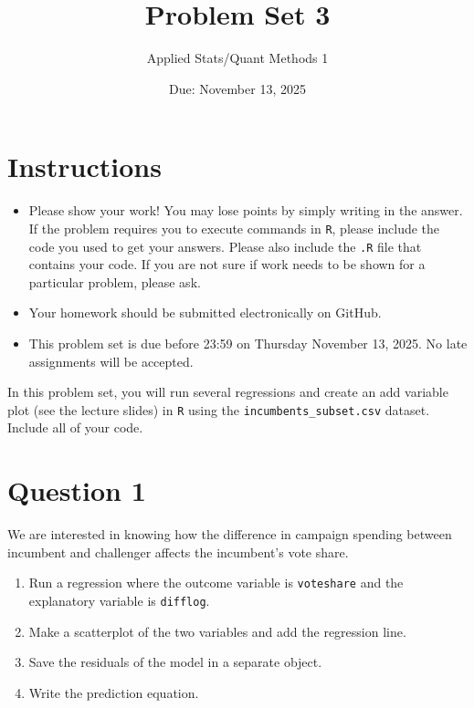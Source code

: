 \documentclass[12pt,letterpaper]{article}
\title{Problem Set 3}
\date{Due: November 13, 2025}
\author{Applied Stats/Quant Methods 1}
\begin{document}
	\maketitle
	\section*{Instructions}
	\begin{itemize}
		\item Please show your work! You may lose points by simply writing in the answer. If the problem requires you to execute commands in \texttt{R}, please include the code you used to get your answers. Please also include the \texttt{.R} file that contains your code. If you are not sure if work needs to be shown for a particular problem, please ask.
	\item Your homework should be submitted electronically on GitHub.
	\item This problem set is due before 23:59 on Thursday November 13, 2025. No late assignments will be accepted.

	\end{itemize}

		\vspace{.25cm}
	
\noindent In this problem set, you will run several regressions and create an add variable plot (see the lecture slides) in \texttt{R} using the \texttt{incumbents\_subset.csv} dataset. Include all of your code.

	\vspace{.5cm}
\section*{Question 1}
\vspace{.25cm}
\noindent We are interested in knowing how the difference in campaign spending between incumbent and challenger affects the incumbent's vote share. 
	\begin{enumerate}
		\item Run a regression where the outcome variable is \texttt{voteshare} and the explanatory variable is \texttt{difflog}.	\vspace{5cm}
		\item Make a scatterplot of the two variables and add the regression line. 	\vspace{7cm}
		\item Save the residuals of the model in a separate object.	\vspace{7cm}
		\item Write the prediction equation.
	\end{enumerate}
	
\end{document}
